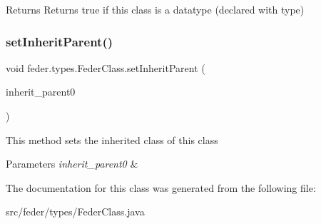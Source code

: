 \begin{DoxyReturn}{Returns}
Returns true if this \textquotesingle{}class\textquotesingle{} is a datatype (declared with \textquotesingle{}type\textquotesingle{}) 
\end{DoxyReturn}
\mbox{\label{classfeder_1_1types_1_1FederClass_abb3f629d1d752c6f6a207f12d2bc715e}} 
\subsubsection{\texorpdfstring{set\+Inherit\+Parent()}{setInheritParent()}}
{\footnotesize\ttfamily void feder.\+types.\+Feder\+Class.\+set\+Inherit\+Parent (\begin{DoxyParamCaption}\item[{\hyperlink{classfeder_1_1types_1_1FederClass}{Feder\+Class}}]{inherit\+\_\+parent0 }\end{DoxyParamCaption})}

This method sets the inherited class of \textquotesingle{}this class\textquotesingle{}


\begin{DoxyParams}{Parameters}
{\em inherit\+\_\+parent0} & \\
\hline
\end{DoxyParams}


The documentation for this class was generated from the following file\+:\begin{DoxyCompactItemize}
\item 
src/feder/types/Feder\+Class.\+java\end{DoxyCompactItemize}
